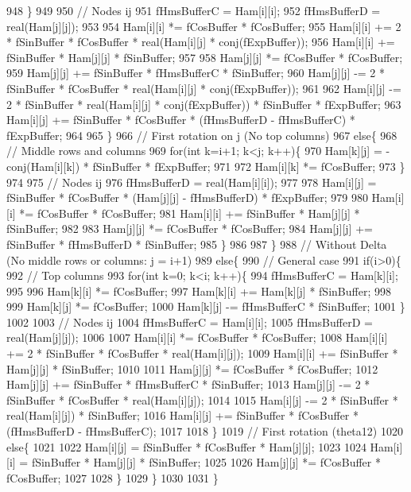\begin{DoxyCode}
948       \}
949 
950       \textcolor{comment}{// Nodes ij}
951       fHmsBufferC = Ham[i][i];
952       fHmsBufferD = real(Ham[j][j]);
953 
954       Ham[i][i] *= fCosBuffer * fCosBuffer;
955       Ham[i][i] += 2 * fSinBuffer * fCosBuffer * real(Ham[i][j] * conj(fExpBuffer));
956       Ham[i][i] += fSinBuffer * Ham[j][j] * fSinBuffer;
957 
958       Ham[j][j] *= fCosBuffer * fCosBuffer;
959       Ham[j][j] += fSinBuffer * fHmsBufferC * fSinBuffer;
960       Ham[j][j] -= 2 * fSinBuffer * fCosBuffer * real(Ham[i][j] * conj(fExpBuffer));
961 
962       Ham[i][j] -= 2 * fSinBuffer * real(Ham[i][j] * conj(fExpBuffer)) * fSinBuffer * fExpBuffer;
963       Ham[i][j] += fSinBuffer * fCosBuffer * (fHmsBufferD - fHmsBufferC) * fExpBuffer;
964 
965     \}
966     \textcolor{comment}{// First rotation on j (No top columns)}
967     \textcolor{keywordflow}{else}\{
968       \textcolor{comment}{// Middle rows and columns}
969       \textcolor{keywordflow}{for}(\textcolor{keywordtype}{int} k=i+1; k<j; k++)\{
970         Ham[k][j] = -conj(Ham[i][k]) * fSinBuffer * fExpBuffer;
971 
972         Ham[i][k] *= fCosBuffer;
973       \}
974 
975       \textcolor{comment}{// Nodes ij}
976       fHmsBufferD = real(Ham[i][i]);
977 
978       Ham[i][j] = fSinBuffer * fCosBuffer * (Ham[j][j] - fHmsBufferD) * fExpBuffer;
979 
980       Ham[i][i] *= fCosBuffer * fCosBuffer;
981       Ham[i][i] += fSinBuffer * Ham[j][j] * fSinBuffer;
982 
983       Ham[j][j] *= fCosBuffer * fCosBuffer;
984       Ham[j][j] += fSinBuffer * fHmsBufferD * fSinBuffer;
985     \}
986 
987   \}
988   \textcolor{comment}{// Without Delta (No middle rows or columns: j = i+1)}
989   \textcolor{keywordflow}{else}\{
990     \textcolor{comment}{// General case}
991     \textcolor{keywordflow}{if}(i>0)\{
992       \textcolor{comment}{// Top columns}
993       \textcolor{keywordflow}{for}(\textcolor{keywordtype}{int} k=0; k<i; k++)\{
994         fHmsBufferC = Ham[k][i];
995 
996         Ham[k][i] *= fCosBuffer;
997         Ham[k][i] += Ham[k][j] * fSinBuffer;
998 
999         Ham[k][j] *= fCosBuffer;
1000         Ham[k][j] -= fHmsBufferC * fSinBuffer;
1001       \}
1002 
1003       \textcolor{comment}{// Nodes ij}
1004       fHmsBufferC = Ham[i][i];
1005       fHmsBufferD = real(Ham[j][j]);
1006 
1007       Ham[i][i] *= fCosBuffer * fCosBuffer;
1008       Ham[i][i] += 2 * fSinBuffer * fCosBuffer * real(Ham[i][j]);
1009       Ham[i][i] += fSinBuffer * Ham[j][j] * fSinBuffer;
1010 
1011       Ham[j][j] *= fCosBuffer * fCosBuffer;
1012       Ham[j][j] += fSinBuffer * fHmsBufferC * fSinBuffer;
1013       Ham[j][j] -= 2 * fSinBuffer * fCosBuffer * real(Ham[i][j]);
1014 
1015       Ham[i][j] -= 2 * fSinBuffer * real(Ham[i][j]) * fSinBuffer;
1016       Ham[i][j] += fSinBuffer * fCosBuffer * (fHmsBufferD - fHmsBufferC);
1017 
1018     \}
1019     \textcolor{comment}{// First rotation (theta12)}
1020     \textcolor{keywordflow}{else}\{
1021 
1022       Ham[i][j] = fSinBuffer * fCosBuffer * Ham[j][j];
1023 
1024       Ham[i][i] = fSinBuffer * Ham[j][j] * fSinBuffer;
1025 
1026       Ham[j][j] *= fCosBuffer * fCosBuffer;
1027 
1028     \}
1029   \}
1030 
1031 \}
\end{DoxyCode}
